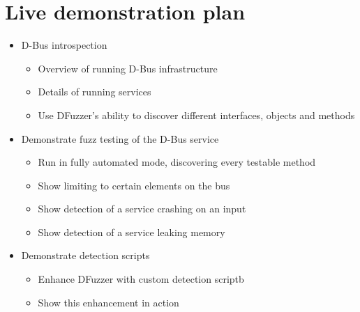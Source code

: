 \documentclass[conference]{IEEEtran}
\begin{document}
\appendix
\section{Live demonstration plan}
\begin{itemize}
	\item D-Bus introspection
		\begin{itemize}
			\item Overview of running D-Bus infrastructure
			\item Details of running services
			\item Use DFuzzer's ability to discover different interfaces, objects and
			methods
		\end{itemize}
	\item Demonstrate fuzz testing of the D-Bus service
		\begin{itemize}
			\item Run in fully automated mode, discovering every testable method
			\item Show limiting to certain elements on the bus
			\item Show detection of a service crashing on an input
			\item Show detection of a service leaking memory
		\end{itemize}
	\item Demonstrate detection scripts
		\begin{itemize}
			\item Enhance DFuzzer with custom detection scriptb
			\item Show this enhancement in action
		\end{itemize}
\end{itemize}
\end{document}
